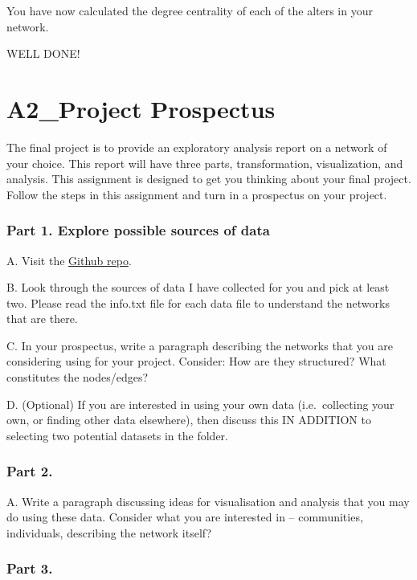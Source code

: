 \documentclass[
  letterpaper,
  DIV=11,
  numbers=noendperiod]{scrreprt}
\begin{document}
You have now calculated the degree centrality of each of the alters in
your network.

WELL DONE!

\chapter{A2\_Project Prospectus}\label{a2_project-prospectus}

The final project is to provide an exploratory analysis report on a
network of your choice. This report will have three parts,
transformation, visualization, and analysis. This assignment is designed
to get you thinking about your final project. Follow the steps in this
assignment and turn in a prospectus on your project.

\subsection{Part 1. Explore possible sources of
data}\label{part-1.-explore-possible-sources-of-data}

A. Visit the
\href{https://github.com/Tom-R-Leppard/SP25_SNA_Book/tree/main/Social\%20Network\%20Analysis\%20-\%20Data}{Github
repo}.

B. Look through the sources of data I have collected for you and pick at
least two. Please read the info.txt file for each data file to
understand the networks that are there.

C. In your prospectus, write a paragraph describing the networks that
you are considering using for your project. Consider: How are they
structured? What constitutes the nodes/edges?

D. (Optional) If you are interested in using your own data
(i.e.~collecting your own, or finding other data elsewhere), then
discuss this IN ADDITION to selecting two potential datasets in the
folder.

\subsection{Part 2.}\label{part-2.}

A. Write a paragraph discussing ideas for visualisation and analysis
that you may do using these data. Consider what you are interested in --
communities, individuals, describing the network itself?

\subsection{Part 3.}\label{part-3.}
\end{document}
